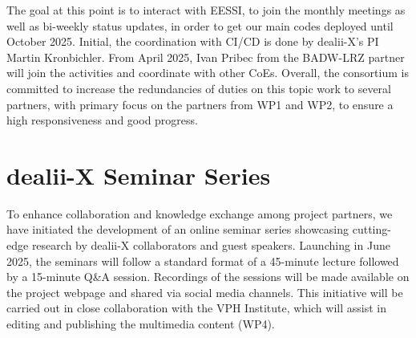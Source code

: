 \documentclass[a4paper,12pt]{article}
\begin{document}
The goal at this point is to interact with EESSI, to join the monthly meetings
as well as bi-weekly status updates, in order to get our main codes deployed
until October 2025. Initial, the coordination with CI/CD is done by dealii-X's
PI Martin Kronbichler. From April 2025, Ivan Pribec from the BADW-LRZ partner
will join the activities and coordinate with other CoEs. Overall, the
consortium is committed to increase the redundancies of duties on this topic
work to several partners, with primary focus on the partners from WP1 and WP2,
to ensure a high responsiveness and good progress.

\section{dealii-X Seminar Series}

To enhance collaboration and knowledge exchange among project partners, we have
initiated the development of an online seminar series showcasing cutting-edge
research by dealii-X collaborators and guest speakers. Launching in June 2025,
the seminars will follow a standard format of a 45-minute lecture followed by a
15-minute Q\&A session. Recordings of the sessions will be made available on the
project webpage and shared via social media channels. This initiative will be
carried out in close collaboration with the VPH Institute, which will assist in
editing and publishing the multimedia content (WP4).

\label{MyLastPage}
\end{document}
